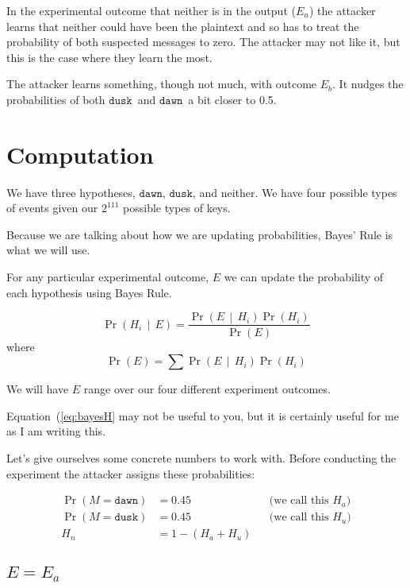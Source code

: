 \documentclass{article}
\newcommand{\prob}[1]{\ensuremath{\operatorname{Pr}\left( #1 \right)}}
\newcommand{\condprob}[2]{\prob{#1\, \middle|\, #2}}
\newcommand\mdusk{\ensuremath{\mathtt{dusk}}}
\newcommand\mdawn{\ensuremath{\mathtt{dawn}}}
\begin{document}
In the experimental outcome that neither is in the output ($E_n$) the attacker learns
that neither could have been the plaintext and so has to treat the probability of both suspected messages to zero. The attacker may not like it, but this is the case where they learn the most.

The attacker learns something, though not much, with outcome $E_b$.
It nudges the probabilities of both \mdusk\ and \mdawn\ a bit closer to 0.5.

\section{Computation}

We have three hypotheses, \mdawn, \mdusk, and neither.
We have four possible types of events given our $2^{111}$ possible types of keys.

Because we are talking about how we are updating probabilities, Bayes' Rule is what we will use.

For any particular experimental outcome, $E$ we can update the probability of each hypothesis using Bayes Rule.

\begin{equation}\label{eq:bayesH}
    \condprob{H_i}{E} = \frac{\condprob{E}{H_i}\prob{H_i}}{\prob{E}}
\end{equation}
where
\begin{equation}\label{eq:ProbE}
    \prob{E} = \sum \condprob{E}{H_i}\prob{H_i}
\end{equation}

We will have $E$ range over our four different experiment outcomes.

Equation~(\ref{eq:bayesH} may not be useful to you, but it is certainly useful for me as I am writing this.

Let's give ourselves some concrete numbers to work with.
Before conducting the experiment the attacker assigns these probabilities:

\begin{align*}
    \prob{M = \mdawn} &= 0.45 && \text{(we call this $H_a$)} \\
    \prob{M = \mdusk} &= 0.45  && \text{(we call this $H_u$)} \\
    H_n & = 1 - (H_a + H_u) 
\end{align*}

\subsection{\(E = E_a\)}
\end{document}
